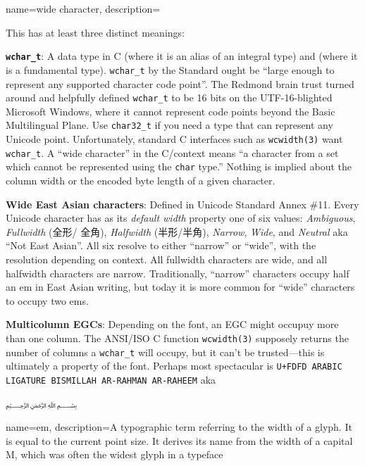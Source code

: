 {
  name={wide character},
  description={This has at least three distinct meanings:
\begin{denseitemize}
\item \textbf{\texttt{wchar\_t}}: A data type in C (where it is an alias of an integral
  type) and \CC (where it is a fundamental type). \texttt{wchar\_t} by the
  Standard ought be ``large enough to represent any supported character code
  point''. The Redmond brain trust turned around and helpfully defined
  \texttt{wchar\_t} to be 16 bits on the UTF-16-blighted Microsoft Windows,
  where it cannot represent code points beyond the Basic Multilingual Plane.
  Use \texttt{char32\_t} if you need a type that can represent any Unicode
  point. Unfortunately, standard C interfaces such as \texttt{wcwidth(3)} want
  \texttt{wchar\_t}. A ``wide character'' in the C/\CC context means ``a character
  from a set which cannot be represented using the \texttt{char} type.'' Nothing is implied
  about the column width or the encoded byte length of a given character.
\item \textbf{Wide East Asian characters}: Defined in Unicode Standard Annex \#11.
    Every Unicode character has as its \textit{default width} property one of
    six values: \textit{Ambiguous}, \textit{Fullwidth} (全形/ 全角),
    \textit{Halfwidth} (半形/半角), \textit{Narrow}, \textit{Wide}, and \textit{Neutral}
    aka ``Not East Asian''. All six resolve to either ``narrow'' or ``wide'', with
    the resolution depending on context. All fullwidth characters are wide, and
    all halfwidth characters are narrow. Traditionally, ``narrow'' characters
    occupy half an \gls{em} in East Asian writing, but today it is more common
    for ``wide'' characters to occupy two ems.
\item \textbf{Multicolumn EGCs}: Depending on the font, an EGC might occupuy
  more than one column. The ANSI/ISO C function \texttt{wcwidth(3)} supposely
  returns the number of columns a \texttt{wchar\_t} will occupy, but it can't
  be trusted---this is ultimately a property of the font. Perhaps most
  spectacular is \texttt{U+FDFD ARABIC LIGATURE BISMILLAH AR-RAHMAN AR-RAHEEM}
  aka \begin{arab}[utf]﷽\end{arab}
\end{denseitemize}}
}

{
  name={em},
  description={A typographic term referring to the width of a glyph. It is
    equal to the current point size. It derives its name from the width of a
    capital M, which was often the widest glyph in a typeface}
}

